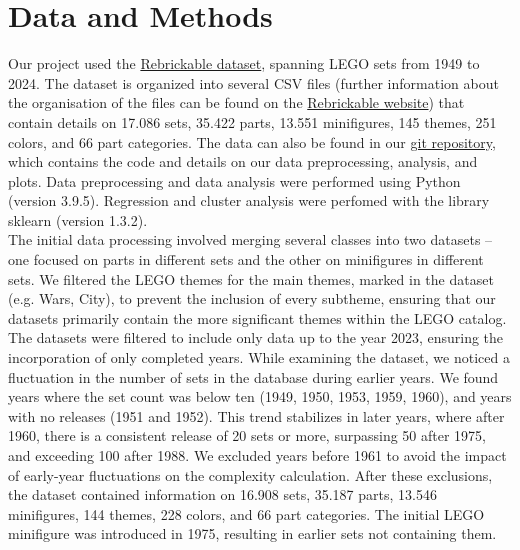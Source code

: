 \documentclass{article}
\theoremstyle{plain}
\theoremstyle{definition}
\theoremstyle{remark}
\newcommand*{\quelle}{
  \footnotesize Imagesource: Inverted image from\\
}
\begin{document}
\section{Data and Methods}\label{sec:methods}

Our project used the \href{https://rebrickable.com/downloads/}{Rebrickable dataset}, spanning LEGO sets from 1949 to 2024. The dataset is organized into several CSV files (further information about the organisation of the files can be found on the \href{https://rebrickable.com/downloads/}{Rebrickable website}) that contain details on 17.086 sets, 35.422 parts, 13.551 minifigures, 145 themes, 251 colors, and 66 part categories. The data can also be found in our \href{https://github.com/eddiebeach99/Data_Literacy/tree/main}{git repository}, which contains the code and details on our data preprocessing, analysis, and plots. Data preprocessing and data analysis were performed using Python (version 3.9.5). Regression and cluster analysis were perfomed with the library sklearn (version 1.3.2).\\
The initial data processing involved merging several classes into two datasets – one focused on parts in different sets and the other on minifigures in different sets. We filtered the LEGO themes for the main themes, marked in the dataset (e.g. \@Star Wars, City), to prevent the inclusion of every subtheme, ensuring that our datasets primarily contain the more significant themes within the LEGO catalog. The datasets were filtered to include only data up to the year 2023, ensuring the incorporation of only completed years. While examining the dataset, we noticed a fluctuation in the number of sets in the database during earlier years. We found years where the set count was below ten (1949, 1950, 1953, 1959, 1960), and years with no releases (1951 and 1952). This trend stabilizes in later years, where after 1960, there is a consistent release of 20 sets or more, surpassing 50 after 1975, and exceeding 100 after 1988. We excluded years before 1961 to avoid the impact of early-year fluctuations on the complexity calculation. After these exclusions, the dataset contained information on 16.908 sets, 35.187 parts, 13.546 minifigures, 144 themes, 228 colors, and 66 part categories. The initial LEGO minifigure was introduced in 1975, resulting in earlier sets not containing them.\\
\end{document}
